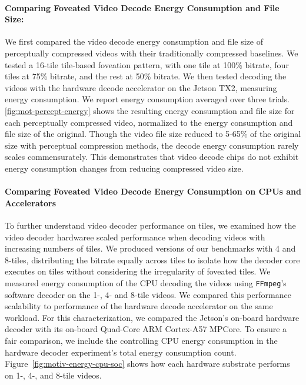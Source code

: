 \paragraph{Comparing Foveated Video Decode Energy Consumption and File Size:} We first compared the video decode energy consumption and file size of perceptually compressed videos with their traditionally compressed baselines.
We tested a 16-tile tile-based foveation pattern, with one tile at 100\% bitrate, four tiles at 75\% bitrate, and the rest at 50\% bitrate.
We then tested decoding the videos with the hardware decode accelerator on the Jetson TX2, measuring energy consumption.
We report energy consumption averaged over three trials.
\ref{fig:mot-percept-energy} shows the resulting energy consumption and file size for each perceptually compressed video, normalized to the energy consumption and file size of the original.
Though the video file size reduced to 5-65\% of the original size with perceptual compression methods, the decode energy consumption rarely scales commensurately.
This demonstrates that video decode chips do not exhibit energy consumption changes from reducing compressed video size.

\motPerceptualEnergy

\paragraph{Comparing Foveated Video Decode Energy Consumption on CPUs and Accelerators}

To further understand video decoder performance on tiles, we examined how the video decoder hardwaree scaled performance when decoding videos with increasing numbers of tiles.
We produced versions of our benchmarks with 4 and 8-tiles, distributing the bitrate equally across tiles to isolate how the decoder core executes on tiles without considering the irregularity of foveated tiles.
We measured energy consumption of the CPU decoding the videos using \texttt{FFmpeg}'s software \hevc decoder on the 1-, 4- and 8-tile videos.
We compared this performance scalability to performance of the hardware decode accelerator on the same workload.
For this characterization, we compared the Jetson's on-board hardware decoder with its on-board Quad-Core ARM Cortex-A57 MPCore.
To ensure a fair comparison, we include the controlling CPU energy consumption in the hardware decoder experiment's total energy consumption count.
Figure~\ref{fig:motiv-energy-cpu-soc} shows how each hardware substrate performs on 1-, 4-, and 8-tile videos.

